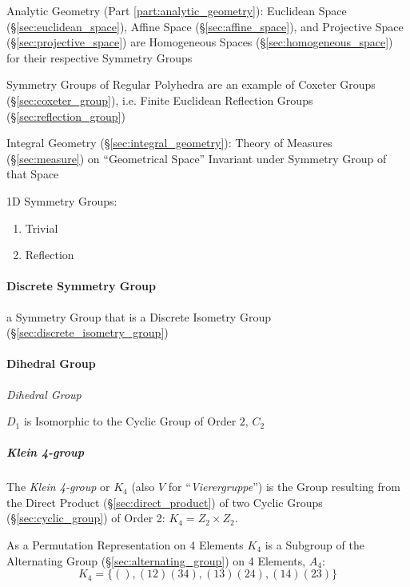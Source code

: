 Analytic Geometry (Part \ref{part:analytic_geometry}): Euclidean Space
(\S\ref{sec:euclidean_space}), Affine Space (\S\ref{sec:affine_space}), and
Projective Space (\S\ref{sec:projective_space}) are Homogeneous Spaces
(\S\ref{sec:homogeneous_space}) for their respective Symmetry Groups

Symmetry Groups of Regular Polyhedra are an example of Coxeter Groups
(\S\ref{sec:coxeter_group}), i.e. Finite Euclidean Reflection Groups
(\S\ref{sec:reflection_group})

Integral Geometry (\S\ref{sec:integral_geometry}): Theory of Measures
(\S\ref{sec:measure}) on ``Geometrical Space'' Invariant under Symmetry Group of
that Space

1D Symmetry Groups: %
\begin{enumerate}
  \item Trivial
  \item Reflection
\end{enumerate}



\paragraph{Discrete Symmetry Group}\label{sec:discrete_symmetry_group}\hfill

a Symmetry Group that is a Discrete Isometry Group
(\S\ref{sec:discrete_isometry_group})



\paragraph{Dihedral Group}\label{sec:dihedral_group}\hfill

\emph{Dihedral Group}

$D_1$ is Isomorphic to the Cyclic Group of Order $2$, $C_2$



\subparagraph{Klein 4-group}\label{sec:klein_4group}\hfill

The \emph{Klein 4-group} or $K_4$ (also $V$ for
``\emph{Vierergruppe}'') is the Group resulting from the Direct
Product (\S\ref{sec:direct_product}) of two Cyclic Groups
(\S\ref{sec:cyclic_group}) of Order 2: $K_4 = Z_2 \times Z_2$.

As a Permutation Representation on 4 Elements $K_4$ is a Subgroup of
the Alternating Group (\S\ref{sec:alternating_group}) on 4 Elements,
$A_4$:
\[
    K_4 = \{ (), (12)(34), (13)(24), (14)(23) \}
\]

